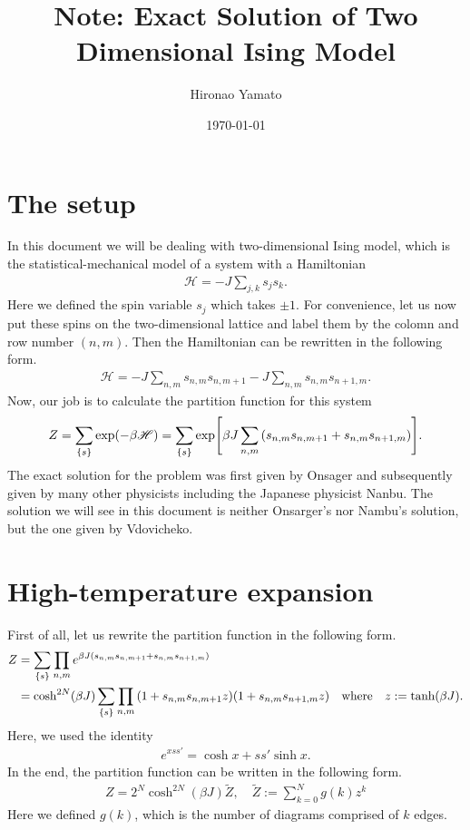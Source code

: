 \documentclass[aps, 12pt]{revtex4-2}
\begin{document}
\title{Note: Exact Solution of Two Dimensional Ising Model}
\author{Hironao Yamato}
\date{\today}
\maketitle

\newcommand{\square}{\tikz \draw (0, 0) -- (0.7, 0) -- (0.7, 0.7) -- (0, 0.7) -- (0, 0);}
\newcommand{\rectangle}{\tikz \draw (0, 0) -- (1.4, 0) -- (1.4, 0.7) -- (0, 0.7) -- (0, 0);}
\section{The setup}
In this document we will be dealing with two-dimensional Ising model, which is the statistical-mechanical model of a system with a Hamiltonian
\begin{align*}
  \mathscr{H} = - J \sum_{j,k} s_js_k.
\end{align*}
Here we defined the spin variable $s_j$ which takes $\pm 1$. For convenience, let us now put these spins on the two-dimensional lattice and label them by the colomn and row number $(n ,m)$. Then the Hamiltonian can be rewritten in the following form.
\begin{align*}
  \mathscr{H} = - J \sum_{n, m}s_{n, m}s_{n, m+1} - J\sum_{n, m} s_{n, m}s_{n+1, m}.
\end{align*}
Now, our job is to calculate the partition function for this system
\begin{align*}
  Z = \sum_{\qty{s}} \exp(-\beta \mathscr{H}) = \sum_{\qty{s}}\exp[\beta J \sum_{n, m}\qty(s_{n,m}s_{n,m+1} + s_{n, m}s_{n+1,m})].
\end{align*}
The exact solution for the problem was first given by Onsager and subsequently given by many other physicists including the Japanese physicist Nanbu. The solution we will see in this document is neither Onsarger's nor Nambu's solution, but the one given by Vdovicheko.

\section{High-temperature expansion}
First of all, let us rewrite the partition function in the following form.
\begin{align*}
  Z &= \sum_{\qty{s}} \prod_{n, m} e^{\beta J\qty(s_{n,m}s_{n,m+1} + s_{n,m}s_{n+1,m})} \\
  &= \cosh^{2N}(\beta J)\sum_{\qty{s}} \prod_{n, m}\qty(1+ s_{n,m}s_{n,m+1}z)\qty(1+ s_{n,m}s_{n+1,m}z)
  \quad\mathrm{where}\quad z := \tanh(\beta J).
\end{align*}
Here, we used the identity
\begin{align*}
  e^{x ss'} = \cosh x + ss' \sinh x.
\end{align*}
In the end, the partition function can be written in the following form.
\begin{align*}
  Z = 2^N \cosh^{2N}(\beta J) \tilde{Z}, \quad \tilde{Z} := \sum_{k = 0}^{N} g(k)z^k
\end{align*}
Here we defined $g(k)$, which is the number of diagrams comprised of $k$ edges.
\end{document}
